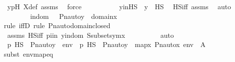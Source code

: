 \begin{isabellebody}
\ ypH\ X{\isacharunderscore}{\kern0pt}def\ assms\ \isamarkupfalse%
\ force\ \isanewline
\ \ \ \ \ \ \isamarkupfalse%
\ \isamarkupfalse%
\ yinHS\ {\isacharcolon}{\kern0pt}\ {\isachardoublequoteopen}y\ {\isasymin}\ HS{\isachardoublequoteclose}\ \isamarkupfalse%
\ HS{\isacharunderscore}{\kern0pt}iff\ assms\ \isamarkupfalse%
\ auto\isanewline
\isanewline
\ \ \ \ \ \ \isamarkupfalse%
\ indom\ {\isacharcolon}{\kern0pt}\ \ {\isachardoublequoteopen}Pn{\isacharunderscore}{\kern0pt}auto{\isacharparenleft}{\kern0pt}{\isasympi}{\isacharparenright}{\kern0pt}{\isacharbackquote}{\kern0pt}y\ {\isasymin}\ domain{\isacharparenleft}{\kern0pt}x{\isacharparenright}{\kern0pt}{\isachardoublequoteclose}\isanewline
\ \ \ \ \ \ \ \ \isamarkupfalse%
{\isacharparenleft}{\kern0pt}rule\ iffD{}{\isacharcomma}{\kern0pt}\ rule\ Pn{\isacharunderscore}{\kern0pt}auto{\isacharunderscore}{\kern0pt}domain{\isacharunderscore}{\kern0pt}closed{\isacharparenright}{\kern0pt}\isanewline
\ \ \ \ \ \ \ \ \isamarkupfalse%
\ assms\ HS{\isacharunderscore}{\kern0pt}iff\ piin\ yindom\ Ssubsetsymx\isanewline
\ \ \ \ \ \ \ \ \isamarkupfalse%
\ auto\isanewline
\isanewline
\ \ \ \ \ \ \isamarkupfalse%
\ {\isachardoublequoteopen}{\isasympi}{\isacharbackquote}{\kern0pt}p\ {\isasymtturnstile}HS\ {\isasymphi}\ {\isacharbrackleft}{\kern0pt}Pn{\isacharunderscore}{\kern0pt}auto{\isacharparenleft}{\kern0pt}{\isasympi}{\isacharparenright}{\kern0pt}{\isacharbackquote}{\kern0pt}y{\isacharbrackright}{\kern0pt}\ {\isacharat}{\kern0pt}\ env\ {\isasymlongleftrightarrow}\ {\isasympi}{\isacharbackquote}{\kern0pt}p\ {\isasymtturnstile}HS\ {\isasymphi}\ {\isacharbrackleft}{\kern0pt}Pn{\isacharunderscore}{\kern0pt}auto{\isacharparenleft}{\kern0pt}{\isasympi}{\isacharparenright}{\kern0pt}{\isacharbackquote}{\kern0pt}y{\isacharbrackright}{\kern0pt}\ {\isacharat}{\kern0pt}\ map{\isacharparenleft}{\kern0pt}{\isasymlambda}x{\isachardot}{\kern0pt}\ Pn{\isacharunderscore}{\kern0pt}auto{\isacharparenleft}{\kern0pt}{\isasympi}{\isacharparenright}{\kern0pt}{\isacharbackquote}{\kern0pt}x{\isacharcomma}{\kern0pt}\ env{\isacharparenright}{\kern0pt}{\isachardoublequoteclose}\ {\isacharparenleft}{\kern0pt}\ {\isachardoublequoteopen}{\isacharquery}{\kern0pt}A\ {\isasymlongleftrightarrow}\ {\isacharunderscore}{\kern0pt}{\isachardoublequoteclose}{\isacharparenright}{\kern0pt}\ \isanewline
\ \ \ \ \ \ \ \ \isamarkupfalse%
{\isacharparenleft}{\kern0pt}subst\ envmapeq{\isacharparenright}{\kern0pt}\isanewline

\end{isabellebody}
